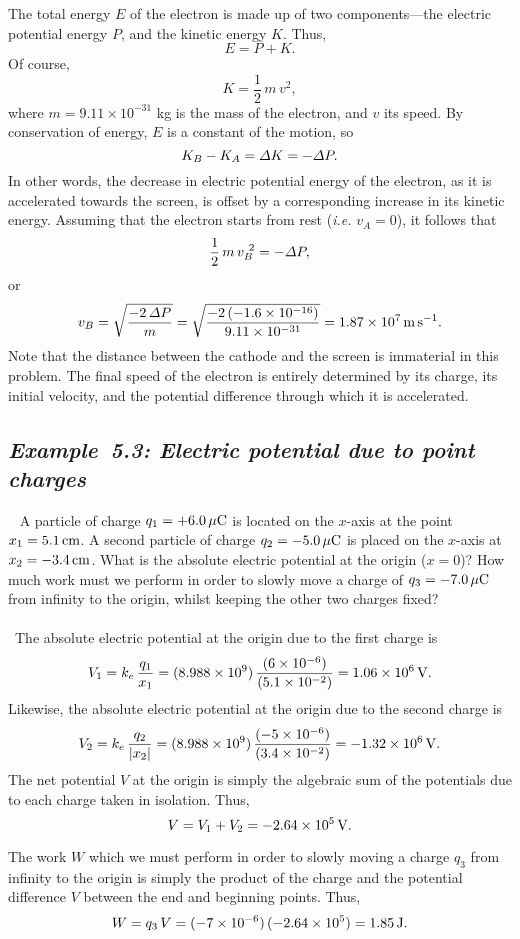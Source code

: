 The total energy $E$ of the electron is made up of two components---the electric
potential energy $P$, and the kinetic energy $K$. Thus,
$$
E = P + K.
$$
Of course,
$$
K = \frac{1}{2} \,m\, v^2,
$$
where $m=9.11\times 10^{-31}$ kg is the mass of the electron, and $v$ 
its speed. By  conservation of energy, $E$ is a constant of the motion, so
$$
K_B - K_A = {\mit\Delta} K = - {\mit\Delta}P.
$$
In other words, the decrease in electric potential energy of the electron, as 
it is accelerated towards the screen, is offset by a corresponding increase in its kinetic
energy.
Assuming that the electron starts from rest ({\em i.e.} $v_A=0$), it follows that
$$
\frac{1}{2}\,m\,v_B^{~2} =  - {\mit\Delta}P,
$$
or
$$
v_B = \sqrt{\frac{-2\,{\mit\Delta}P}{m}} = \sqrt{
\frac{-2\,(-1.6\times 10^{-16})}{9.11\times
10^{-31}}} = 1.87\times 10^7\,{\rm m\,s^{-1}}.
$$
Note that the distance between the cathode and the screen is immaterial in this
problem. The final speed of the electron is entirely determined by
its charge, its initial velocity,
 and the potential difference through which it is accelerated. 


\subsection*{\em Example~5.3: Electric potential due to point charges}
~ A particle of charge $q_1=+6.0\,\mu{\rm C}$ is located
on the $x$-axis at the point $x_1=5.1\,{\rm cm}$. A second particle of
charge $q_2=-5.0\,\mu{\rm C}$ is placed on the $x$-axis at $x_2=-3.4\,{\rm cm}$. What is
the absolute electric potential at the origin ($x=0$)? How much work must we perform in
order to slowly move a charge of $q_3=-7.0\,\mu{\rm C}$ from infinity to the origin, whilst keeping
the other two charges fixed?\\
~\\
~The absolute electric potential at the origin due to the first
charge is 
$$
V_1 = k_e\,\frac{q_1}{x_1} = (8.988\times 10^9)\,\frac{(6\times 10^{-6})}{(5.1\times 10^{-2})}= 1.06 \times 10^6\,{\rm V}.
$$
Likewise, the absolute electric potential at the origin due to the second charge is
$$
V_2 = k_e\,\frac{q_2}{|x_2|} = (8.988\times 10^9)\,\frac{(-5\times 10^{-6})}{(3.4\times 10^{-2})}=-1.32\times 10^6\,{\rm V}.
$$
The net potential $V$ at the origin is simply the algebraic sum of the potentials due to each charge
taken in isolation. Thus,
$$
V = V_1 + V_2 = -2.64\times 10^5\,{\rm V}.
$$

The work $W$ which we must perform in order to slowly moving a charge $q_3$ from infinity to the origin is
simply the product of the charge and the potential difference $V$ between the end and beginning
points. Thus,
$$
W = q_3\, V = (-7\times 10^{-6})\,(-2.64\times  10^5) = 1.85\,{\rm J}.
$$

